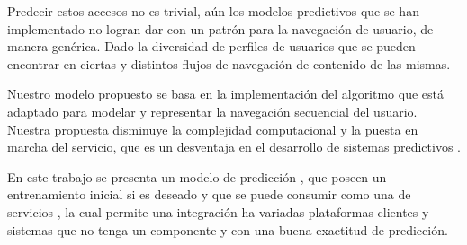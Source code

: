 Predecir estos  accesos no es trivial, aún los modelos predictivos que se han implementado no logran dar con un patrón para la navegación de usuario, de manera genérica. Dado la diversidad de perfiles de usuarios que se pueden encontrar en ciertas \webs  y distintos flujos de navegación de contenido de las mismas.  



Nuestro modelo propuesto se basa en la implementación del algoritmo \lzSieteOcho que está adaptado para modelar y representar la navegación secuencial del usuario. Nuestra propuesta disminuye la complejidad computacional  y la puesta en marcha del servicio, que es un desventaja en el desarrollo de sistemas predictivos \online.

En este trabajo se presenta un modelo de predicción \online, que poseen un entrenamiento inicial \offline si es deseado y que se puede consumir como una \API de servicios \REST, la cual permite una integración ha variadas plataformas clientes y sistemas que no tenga un componente \online y con una buena exactitud de predicción. 



















